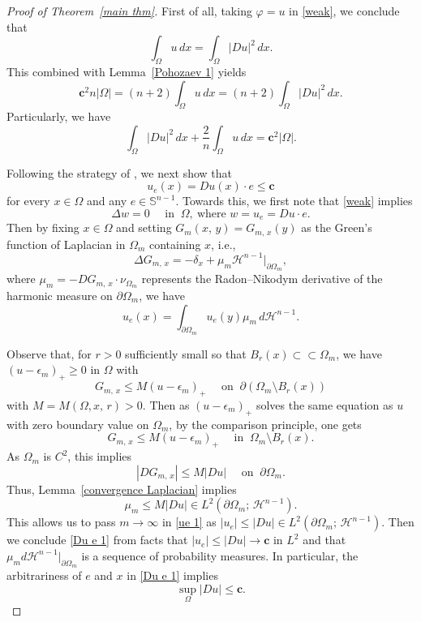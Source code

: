 \documentclass[reqno,11pt]{amsart}
\def\ez{\epsilon}
\numberwithin{equation}{section}
\theoremstyle{remark}
\begin{document}
\begin{proof}[Proof of Theorem~\ref{main thm}]
    First of all, taking $\varphi=u$ in \eqref{weak}, we conclude that
$$\int_{\Omega} u\, dx =    \int_{\Omega}  |Du|^2 \, dx.$$
This combined with Lemma~\ref{Pohozaev 1} yields
\begin{equation}\label{identity 1 1} 
\mathbf{c}^2 n|\Omega|=(n+2)\int_{\Omega} u\, dx =  (n+2) \int_{\Omega} |Du|^2\, dx.   
\end{equation}
Particularly, we have
\begin{equation}\label{identity 2 1}
  \int_{\Omega} |Du|^2 \, dx +\frac{2}{n} \int_{\Omega} u\,dx = \mathbf{c}^2|\Omega|.     
\end{equation}



Following the strategy of \cite[Proposition 3.3]{FZ2025},  we next show that
\begin{equation}\label{Du e 1}
u_e(x)=Du(x)\cdot e\le \mathbf c
\end{equation}
for every $x\in \Omega$ and any $e\in \mathbb S^{n-1}$. Towards this, we first note that \eqref{weak} implies
$$\Delta w=0 \quad  \text{ in } \ \Omega, \  \text{where $w=u_e=Du\cdot e$}.$$
Then by fixing $x\in \Omega$ and setting $G_{m}(x,\,y)=G_{m,\,x}(y)$ as the Green's function of Laplacian in $\Omega_m$ containing   $x$, i.e.,
$$\Delta G_{m,\,{x}}=-\delta_{x} + \mu_m\mathscr H^{n-1}|_{\partial\Omega_m},$$
where $\mu_m=- DG_{m,\,x}\cdot \nu_{\Omega_{m}}$ represents the Radon--Nikodym derivative of the harmonic measure on $\partial \Omega_m$,
we have
\begin{equation}\label{ue 1}
    u_e(x)=\int_{\partial\Omega_m}   u_e (y)\mu_m\,d\mathscr H^{n-1}.
\end{equation}

Observe that, for $r>0$ sufficiently small so that $B_r(x)\subset \subset \Omega_m$, we have $(u -\ez_m)_+\ge 0$ in $\Omega$ with
$$G_{m,\,x}\le M(u-\ez_m)_+ \quad \text{ on } \ \partial(\Omega_m\setminus B_r(x))$$
with $M=M(\Omega,x,\,r)>0$. Then as $(u-\ez_m)_+$ solves the same equation as $u$ with  zero boundary value on $\Omega_m$, by the comparison principle, one gets
$$G_{m,\,x}\le M(u-\ez_m)_+ \quad \text{ in } \ \Omega_m\setminus B_r(x).$$
As $\Omega_m$ is $C^2$, this implies
$$|DG_{m,\,x}|\le M|Du| \quad \text{ on } \ \partial \Omega_m. $$
Thus, Lemma~\ref{convergence Laplacian} implies 
$$\mu_m\le M  |Du|\in L^2(\partial\Omega_m;\,\mathscr H^{n-1}). $$ 
This allows us to pass $m\to \infty$ in \eqref{ue 1} as $|u_e|\le |Du|\in L^2(\partial\Omega_m;\,\mathscr H^{n-1})$. Then we conclude \eqref{Du e 1} from facts that $|u_e|\le |Du|\to \mathbf c$ in $L^2$ and that $\mu_md\mathscr H^{n-1}|_{\partial\Omega_m}$ is a sequence of probability measures.
In particular, the arbitrariness of $e$ and $x$ in \eqref{Du e 1} implies
\begin{equation}\label{HDu 1}
    \sup_{\Omega} |Du|\le \mathbf c. 
\end{equation}


\end{proof}
\end{document}

